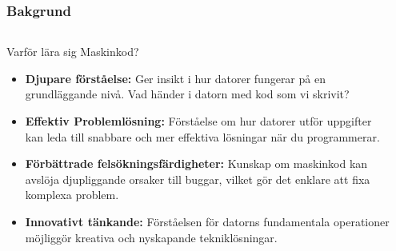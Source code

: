 \begin{frame}
    \frametitle{Bakgrund}
    \begin{columns}
        \begin{column}{0.75\textwidth}
            \begin{block}{Varför lära sig Maskinkod?}
                \begin{itemize}
                    \item \textbf{Djupare förståelse:} Ger insikt i hur datorer fungerar på en grundläggande nivå. Vad händer i datorn med kod som vi skrivit?
                    \item \textbf{Effektiv Problemlösning:} Förståelse om hur datorer utför uppgifter kan leda till snabbare och mer effektiva lösningar när du programmerar.
                    \item \textbf{Förbättrade felsökningsfärdigheter:} Kunskap om maskinkod kan avslöja djupliggande orsaker till buggar, vilket gör det enklare att fixa komplexa problem.
                    \item \textbf{Innovativt tänkande:} Förståelsen för datorns fundamentala operationer möjliggör kreativa och nyskapande tekniklösningar.
                \end{itemize}
            \end{block}
        \end{column}
        \begin{column}{0.25\textwidth}
            \begin{center}
            \end{center}
        \end{column}
    \end{columns}
\end{frame}


